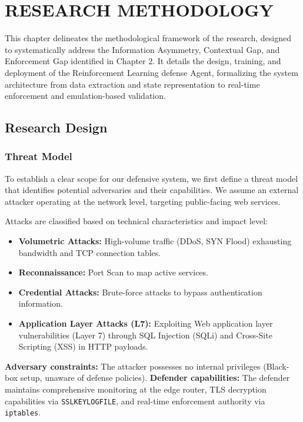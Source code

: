 \documentclass[12pt,a4paper]{report}
\begin{document}
\chapter{RESEARCH METHODOLOGY}

This chapter delineates the methodological framework of the research, designed to systematically address the Information Asymmetry, Contextual Gap, and Enforcement Gap identified in Chapter 2. It details the design, training, and deployment of the Reinforcement Learning defense Agent, formalizing the system architecture from data extraction and state representation to real-time enforcement and emulation-based validation.

\section{Research Design}

\subsection{Threat Model}

To establish a clear scope for our defensive system, we first define a threat model that identifies potential adversaries and their capabilities. We assume an external attacker operating at the network level, targeting public-facing web services.

Attacks are classified based on technical characteristics and impact level:
\begin{itemize}
    \item \textbf{Volumetric Attacks:} High-volume traffic (DDoS, SYN Flood) exhausting bandwidth and TCP connection tables.
    \item \textbf{Reconnaissance:} Port Scan to map active services.
    \item \textbf{Credential Attacks:} Brute-force attacks to bypass authentication information.
    \item \textbf{Application Layer Attacks (L7):} Exploiting Web application layer vulnerabilities (Layer 7) through SQL Injection (SQLi) and Cross-Site Scripting (XSS) in HTTP payloads.
\end{itemize}

\textbf{Adversary constraints:} The attacker possesses no internal privileges (Black-box setup, unaware of defense policies).
\textbf{Defender capabilities:} The defender maintains comprehensive monitoring at the edge router, TLS decryption capabilities via \texttt{SSLKEYLOGFILE}, and real-time enforcement authority via \texttt{iptables}.
\end{document}
